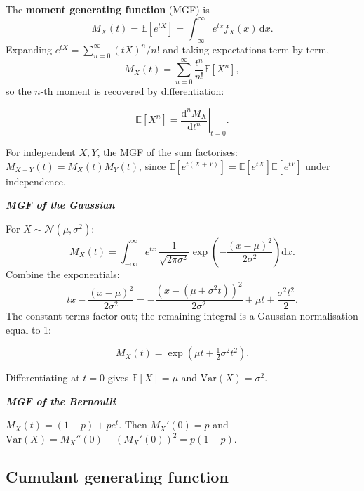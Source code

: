\documentclass[justified,notoc]{tufte-handout}
\def\d{\mathrm{d}}
\def\E{\mathbb{E}}
\def\N{\mathcal{N}}
\def\var{\mathrm{Var}}
\begin{document}
The \textbf{moment generating function} (MGF) is
\begin{equation}
  M_X(t)=\E[e^{tX}]=\int_{-\infty}^{\infty} e^{tx}f_X(x)\,\d x.
  \label{eq:mgf_def}
\end{equation}
Expanding $e^{tX}=\sum_{n=0}^\infty (tX)^n/n!$ and taking expectations term by term,
\begin{equation}
  M_X(t)=\sum_{n=0}^\infty \frac{t^n}{n!}\E[X^n],
\end{equation}
so the $n$-th moment is recovered by differentiation:
\begin{keyresult}
\begin{equation}
  \E[X^n]=\left.\frac{\d^n M_X}{\d t^n}\right|_{t=0}.
  \label{eq:moment_from_MGF}
\end{equation}
\end{keyresult}
For independent $X,Y$, the MGF of the sum factorises:
$M_{X+Y}(t)=M_X(t)M_Y(t)$,
since $\E[e^{t(X+Y)}]=\E[e^{tX}]\E[e^{tY}]$ under independence.

\noindent\textit{\textbf{MGF of the Gaussian}}\quad

For $X\sim\N(\mu,\sigma^2)$:
\begin{equation}
  M_X(t)=\int_{-\infty}^{\infty} e^{tx}\,\frac{1}{\sqrt{2\pi\sigma^2}}\exp\!\left(-\frac{(x-\mu)^2}{2\sigma^2}\right)\d x.
\end{equation}
Combine the exponentials:
\begin{equation}
  tx-\frac{(x-\mu)^2}{2\sigma^2}
  =-\frac{(x-(\mu+\sigma^2 t))^2}{2\sigma^2}+\mu t+\frac{\sigma^2 t^2}{2}.
\end{equation}
The constant terms factor out; the remaining integral is a Gaussian normalisation equal to 1:
\begin{keyresult}
\begin{equation}
  M_X(t)=\exp\!\left(\mu t+\tfrac{1}{2}\sigma^2 t^2\right).
  \label{eq:gaussian_mgf}
\end{equation}
\end{keyresult}
Differentiating at $t=0$ gives $\E[X]=\mu$ and $\var(X)=\sigma^2$.

\noindent\textit{\textbf{MGF of the Bernoulli}}\quad

$M_X(t)=(1-p)+pe^t$. Then $M_X'(0)=p$ and $\var(X)=M_X''(0)-(M_X'(0))^2=p(1-p)$.

\subsection{Cumulant generating function}
\end{document}
